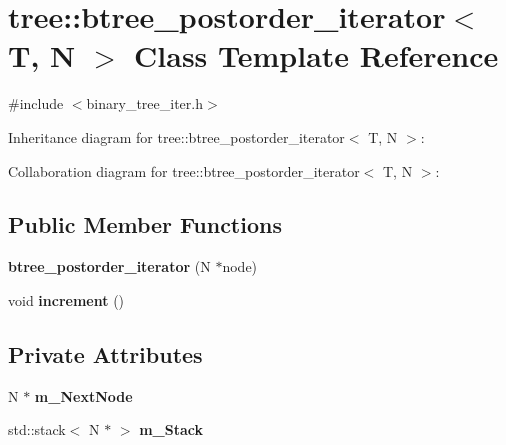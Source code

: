 \hypertarget{classtree_1_1btree__postorder__iterator}{\section{tree\-:\-:btree\-\_\-postorder\-\_\-iterator$<$ T, N $>$ Class Template Reference}
\label{classtree_1_1btree__postorder__iterator}
}


{\ttfamily \#include $<$binary\-\_\-tree\-\_\-iter.\-h$>$}



Inheritance diagram for tree\-:\-:btree\-\_\-postorder\-\_\-iterator$<$ T, N $>$\-:


Collaboration diagram for tree\-:\-:btree\-\_\-postorder\-\_\-iterator$<$ T, N $>$\-:
\subsection*{Public Member Functions}
\begin{DoxyCompactItemize}
\item 
\hypertarget{classtree_1_1btree__postorder__iterator_a9dec1c88cc657e81f3579058beda85b1}{{\bfseries btree\-\_\-postorder\-\_\-iterator} (N $\ast$node)}\label{classtree_1_1btree__postorder__iterator_a9dec1c88cc657e81f3579058beda85b1}

\item 
\hypertarget{classtree_1_1btree__postorder__iterator_ab4fb98322432ec53accacd76d17d520e}{void {\bfseries increment} ()}\label{classtree_1_1btree__postorder__iterator_ab4fb98322432ec53accacd76d17d520e}

\end{DoxyCompactItemize}
\subsection*{Private Attributes}
\begin{DoxyCompactItemize}
\item 
\hypertarget{classtree_1_1btree__postorder__iterator_afdbf2d545eae73723f0d93caa427cb85}{N $\ast$ {\bfseries m\-\_\-\-Next\-Node}}\label{classtree_1_1btree__postorder__iterator_afdbf2d545eae73723f0d93caa427cb85}

\item 
\hypertarget{classtree_1_1btree__postorder__iterator_a696bd97e9f2496b7a0ea95867fe87dc2}{std\-::stack$<$ N $\ast$ $>$ {\bfseries m\-\_\-\-Stack}}\label{classtree_1_1btree__postorder__iterator_a696bd97e9f2496b7a0ea95867fe87dc2}

\end{DoxyCompactItemize}
